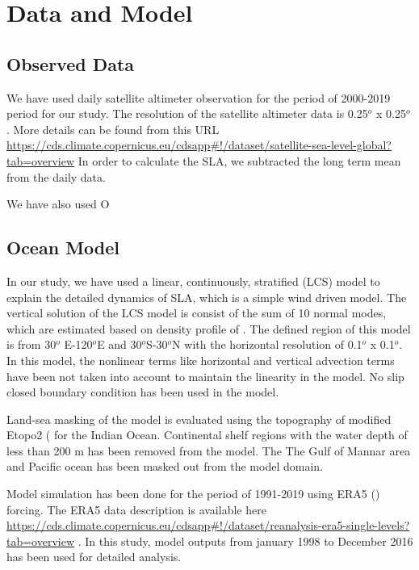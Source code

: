 \documentclass[review]{elsarticle}
\begin{document}
\section{Data and Model}
\subsection{Observed Data}
We have used daily satellite altimeter observation for the period of 2000-2019 period for our study. The resolution of the satellite altimeter data is 0.25$^o$ x 0.25$^o$. More details can be found from this URL \url{https://cds.climate.copernicus.eu/cdsapp#!/dataset/satellite-sea-level-global?tab=overview} In order to calculate the SLA, we subtracted the long term mean from the daily data.

We have also used O

\subsection{Ocean Model}
In our study, we have used a linear, continuously, stratified (LCS) model to explain the detailed dynamics of SLA, which is a simple wind driven model. The vertical solution of the LCS model is consist of the sum of 10 normal modes, which are estimated based on density profile of \cite{moore1990excitation}. The defined region of this model is from 30$^o$ E-120$^o$E and 30$^o$S-30$^o$N with the horizontal resolution of 0.1$^o$ x 0.1$^o$. In this model, the nonlinear terms like horizontal and vertical advection terms have been not taken into account to maintain the linearity in the model. No slip closed boundary condition has been used in the model.

Land-sea masking of the model is evaluated using the topography of modified Etopo2 (\cite{sindhu2007improved} for the Indian Ocean. Continental shelf regions with the water depth of less than 200 m has been removed from the model. The The Gulf of Mannar area and Pacific ocean has been masked out from the model domain. 

Model simulation has been done for the period of 1991-2019 using ERA5 (\cite{hersbach2020era5}) forcing. The ERA5 data description is available here \url{https://cds.climate.copernicus.eu/cdsapp#!/dataset/reanalysis-era5-single-levels?tab=overview} . In this study, model outputs from january 1998 to December 2016 has been used for detailed analysis.
\end{document}
